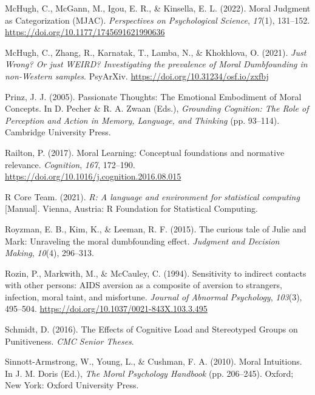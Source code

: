 \documentclass[
  american,
  man,floatsintext]{apa7}
\begin{document}
\leavevmode\hypertarget{ref-mchugh_moral_2022}{}%
McHugh, C., McGann, M., Igou, E. R., \& Kinsella, E. L. (2022). Moral Judgment as Categorization (MJAC). \emph{Perspectives on Psychological Science}, \emph{17}(1), 131--152. \url{https://doi.org/10.1177/1745691621990636}

\leavevmode\hypertarget{ref-mchugh_just_2021}{}%
McHugh, C., Zhang, R., Karnatak, T., Lamba, N., \& Khokhlova, O. (2021). \emph{Just Wrong? Or just WEIRD? Investigating the prevalence of Moral Dumbfounding in non-Western samples}. PsyArXiv. \url{https://doi.org/10.31234/osf.io/zxfbj}

\leavevmode\hypertarget{ref-prinz_passionate_2005}{}%
Prinz, J. J. (2005). Passionate Thoughts: The Emotional Embodiment of Moral Concepts. In D. Pecher \& R. A. Zwaan (Eds.), \emph{Grounding Cognition: The Role of Perception and Action in Memory, Language, and Thinking} (pp. 93--114). Cambridge University Press.

\leavevmode\hypertarget{ref-railton_moral_2017}{}%
Railton, P. (2017). Moral Learning: Conceptual foundations and normative relevance. \emph{Cognition}, \emph{167}, 172--190. \url{https://doi.org/10.1016/j.cognition.2016.08.015}

\leavevmode\hypertarget{ref-r_core_team_r:_2021}{}%
R Core Team. (2021). \emph{R: A language and environment for statistical computing} {[}Manual{]}. Vienna, Austria: R Foundation for Statistical Computing.

\leavevmode\hypertarget{ref-royzman_curious_2015}{}%
Royzman, E. B., Kim, K., \& Leeman, R. F. (2015). The curious tale of Julie and Mark: Unraveling the moral dumbfounding effect. \emph{Judgment and Decision Making}, \emph{10}(4), 296--313.

\leavevmode\hypertarget{ref-rozin_sensitivity_1994}{}%
Rozin, P., Markwith, M., \& McCauley, C. (1994). Sensitivity to indirect contacts with other persons: AIDS aversion as a composite of aversion to strangers, infection, moral taint, and misfortune. \emph{Journal of Abnormal Psychology}, \emph{103}(3), 495--504. \url{https://doi.org/10.1037/0021-843X.103.3.495}

\leavevmode\hypertarget{ref-schmidt_effects_2016}{}%
Schmidt, D. (2016). The Effects of Cognitive Load and Stereotyped Groups on Punitiveness. \emph{CMC Senior Theses}.

\leavevmode\hypertarget{ref-sinnott-armstrong_moral_2010}{}%
Sinnott-Armstrong, W., Young, L., \& Cushman, F. A. (2010). Moral Intuitions. In J. M. Doris (Ed.), \emph{The Moral Psychology Handbook} (pp. 206--245). Oxford; New York: Oxford University Press.
\end{document}
